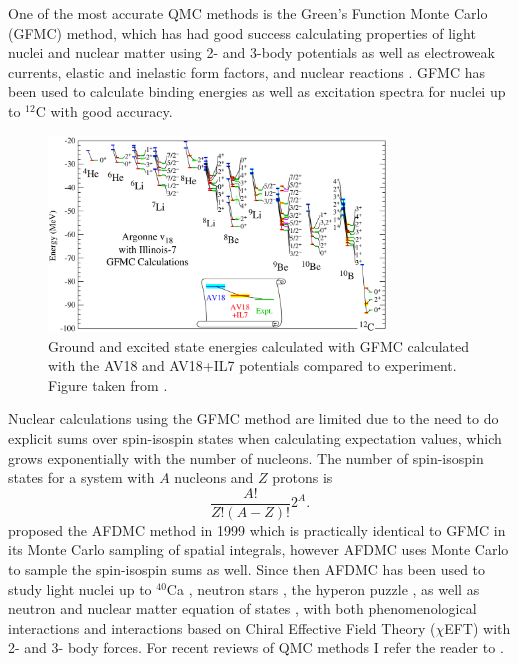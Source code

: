 One of the most accurate QMC methods is the Green's Function Monte Carlo (GFMC) method, which has had good success calculating properties of light nuclei and nuclear matter using 2- and 3-body potentials as well as electroweak currents, elastic and inelastic form factors, and nuclear reactions \cite{carlson2015}. GFMC has been used to calculate binding energies as well as excitation spectra for nuclei up to $^{12}$C with good accuracy.
\begin{figure}[h!]
   \centering
   \includegraphics[width=0.8\textwidth]{figures/gfmc_energies.png}
   \caption{Ground and excited state energies calculated with GFMC calculated with the AV18 and AV18+IL7 potentials compared to experiment. Figure taken from \cite{carlson2015}.}
   \label{fig:energy_jaslin}
\end{figure}
Nuclear calculations using the GFMC method are limited due to the need to do explicit sums over spin-isospin states when calculating expectation values, which grows exponentially with the number of nucleons. The number of spin-isospin states for a system with $A$ nucleons and $Z$ protons is
\begin{equation}
   \frac{A!}{Z!(A-Z)!}2^A.
\end{equation}
\cite{schmidt1999} proposed the AFDMC method in 1999 which is practically identical to GFMC in its Monte Carlo sampling of spatial integrals, however AFDMC uses Monte Carlo to sample the spin-isospin sums as well. Since then AFDMC has been used to study light nuclei up to $^{40}$Ca \cite{gandolfi2007,lonardoni2017}, neutron stars \cite{gandolfi2014_2,gandolfi2012,tews2018}, the hyperon puzzle \cite{lonardoni2015,gandolfi2017_2}, as well as neutron and nuclear matter equation of states \cite{gandolfi2007_2,gandolfi2014,tews2018}, with both phenomenological interactions and interactions based on Chiral Effective Field Theory ($\chi$EFT) \cite{lonardoni2018_3,lonardoni2018} with 2- and 3- body forces. For recent reviews of QMC methods I refer the reader to \cite{carlson2015,lynn2019}.

